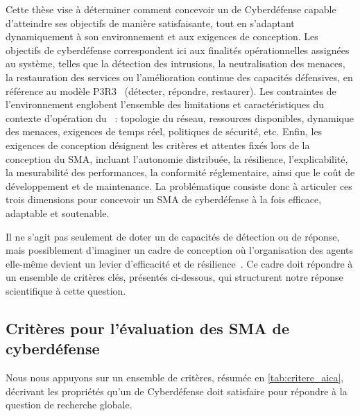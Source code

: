 Cette thèse vise à déterminer comment concevoir un  de Cyberdéfense capable d'atteindre ses objectifs de manière satisfaisante, tout en s'adaptant dynamiquement à son environnement et aux exigences de conception. Les objectifs de cyberdéfense correspondent ici aux finalités opérationnelles assignées au système, telles que la détection des intrusions, la neutralisation des menaces, la restauration des services ou l'amélioration continue des capacités défensives, en référence au modèle P3R3~\cite{Theron2013P3R3} (détecter, répondre, restaurer). Les contraintes de l'environnement englobent l'ensemble des limitations et caractéristiques du contexte d'opération du ~: topologie du réseau, ressources disponibles, dynamique des menaces, exigences de temps réel, politiques de sécurité, etc. Enfin, les exigences de conception désignent les critères et attentes fixés lors de la conception du SMA, incluant l'autonomie distribuée, la résilience, l'explicabilité, la mesurabilité des performances, la conformité réglementaire, ainsi que le coût de développement et de maintenance. La problématique consiste donc à articuler ces trois dimensions pour concevoir un SMA de cyberdéfense à la fois efficace, adaptable et soutenable.

\medskip

\noindent
Il ne s'agit pas seulement de doter un  de capacités de détection ou de réponse, mais possiblement d'imaginer un cadre de conception où l'organisation des agents elle-même devient un levier d'efficacité et de résilience~\cite{Picard2006, DiMarzoSerugendo2006}. Ce cadre doit répondre à un ensemble de critères clés, présentés ci-dessous, qui structurent notre réponse scientifique à cette question.

\subsection*{Critères pour l'évaluation des SMA de cyberdéfense}

%         

Nous nous appuyons sur un ensemble de critères, résumée en \autoref{tab:critere_aica}, décrivant les propriétés qu'un  de Cyberdéfense doit satisfaire pour répondre à la question de recherche globale.

